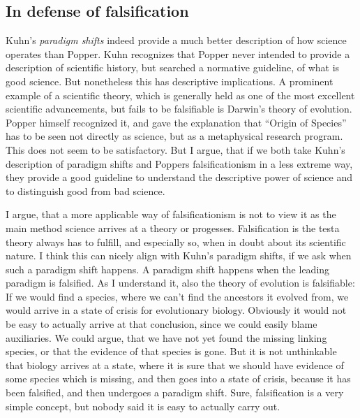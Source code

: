 \subsection{In defense of falsification}
Kuhn's \emph{paradigm shifts} indeed provide a much better description of
how science operates than Popper. Kuhn recognizes that
Popper never intended to provide a description of scientific history,
but searched a normative guideline, of what is good science.
But nonetheless this has descriptive implications.
A prominent example of a scientific theory, which is
generally held as one of the most excellent scientific advancements,
but fails to be falsifiable is Darwin's theory of evolution.
Popper himself recognized it, and gave the explanation that
\enquote{Origin of Species} has to be seen not directly as science, but
as a metaphysical research program\cite[197]{philsciencebook}. This does not seem to be satisfactory.
But I argue, that if we both take Kuhn's description of paradigm shifts
and Poppers falsificationism in a less extreme way, they provide
a good guideline to understand the descriptive power of science and
to distinguish good from bad science.

I argue, that a more applicable way of falsificationism is not to view it as the
main method science arrives at a theory or progesses.
Falsification is the testa theory always
has to fulfill, and especially so, when in doubt about its scientific nature.
I think this can nicely align with Kuhn's paradigm shifts, if we
ask when such a paradigm shift happens.
A paradigm shift happens when the leading paradigm
is falsified.
As I understand it, also the theory of evolution is falsifiable:
If we would find a species, where we can't find the ancestors
it evolved from, we would arrive in a state of crisis for
evolutionary biology.
Obviously it would not be easy to actually arrive at that conclusion, since
we could easily blame auxiliaries. We could argue, that we have not
yet found the missing linking species, or that the evidence of that species is gone.
But it is not unthinkable that biology arrives at a state, where
it is sure that we should have evidence of some species which is missing,
and then goes into a state of crisis, because it has been falsified,
and then undergoes a paradigm shift.
Sure, falsification is a very simple concept, but nobody said it is
easy to actually carry out.

